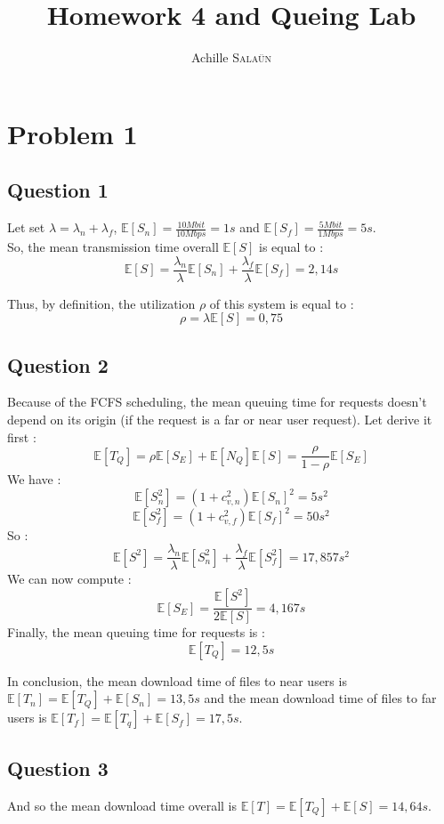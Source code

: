 \documentclass[a4paper]{report}
\title{Homework 4 and Queing Lab}
\author{Achille \textsc{Sala\"{u}n}}
\begin{document}
\maketitle
\section*{Problem 1}
\subsection*{Question 1}
Let set $\lambda=\lambda_{n}+\lambda_{f}$, $\mathbb{E}[S_{n}]=\frac{10 Mbit}{10 Mbps}=1s$ and $\mathbb{E}[S_{f}]=\frac{5 Mbit}{1 Mbps}=5s$. \\

So, the mean transmission time overall $\mathbb{E}[S]$ is equal to :
\[\mathbb{E}[S] = \frac{\lambda_{n}}{\lambda} \mathbb{E}[S_{n}]+\frac{\lambda_{f}}{\lambda} \mathbb{E}[S_{f}] = 2,14s\]

Thus, by definition, the utilization $\rho$ of this system is equal to :
\[\rho = \lambda \mathbb{E}[S] = 0,75\]

\subsection*{Question 2}
Because of the FCFS scheduling, the mean queuing time for requests doesn't depend on its origin (if the request is a far or near user request). Let derive it first : 
\[\mathbb{E}[T_{Q}]=\rho \mathbb{E}[S_{E}]+\mathbb{E}[N_{Q}] \mathbb{E}[S] = \frac{\rho}{1-\rho}\mathbb{E}[S_{E}]\]
We have :
\[\mathbb{E}[S_{n}^{2}]=(1+c_{v,n}^{2})\mathbb{E}[S_{n}]^{2} = 5s^{2}\] 
\[\mathbb{E}[S_{f}^{2}]=(1+c_{v,f}^{2})\mathbb{E}[S_{f}]^{2} = 50s^{2}\]
So : 
\[\mathbb{E}[S^{2}]= \frac{\lambda_{n}}{\lambda} \mathbb{E}[S_{n}^{2}]+\frac{\lambda_{f}}{\lambda} \mathbb{E}[S_{f}^{2}] = 17,857s^{2}\]
We can now compute :
\[\mathbb{E}[S_{E}]=\frac{\mathbb{E}[S^{2}]}{2 \mathbb{E}[S]}=4,167s\] 
Finally, the mean queuing time for requests is :
\[\mathbb{E}[T_{Q}]=12,5s\]

In conclusion, the mean download time of files to near users is $\mathbb{E}[T_n]=\mathbb{E}[T_{Q}]+\mathbb{E}[S_{n}]=13,5s$ and the mean download time of files to far users is $\mathbb{E}[T_f]=\mathbb{E}[T_{q}]+\mathbb{E}[S_{f}]=17,5s$.

\subsection*{Question 3}
And so the mean download time overall is $\mathbb{E}[T]=\mathbb{E}[T_{Q}]+\mathbb{E}[S]=14,64s$.
\end{document}
